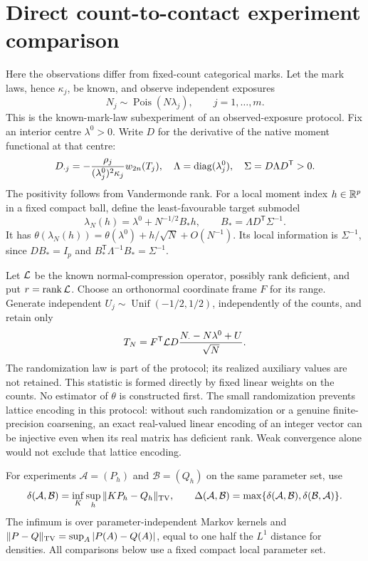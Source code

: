 \section{Direct count-to-contact experiment comparison}\label{sec:score-contact}
Here the observations differ from fixed-count categorical marks. Let the mark laws, hence $\kappa_j$, be known, and observe independent exposures
\[
 N_j\sim\operatorname{Pois}(N\lambda_j),\qquad j=1,\ldots,m.
\]
This is the known-mark-law subexperiment of an observed-exposure protocol. Fix an interior centre $\lambda^0>0$. Write $D$ for the derivative of the native moment functional at that centre:
\[
 D_{\cdot j}=-\frac{\rho_j}{(\lambda_j^0)^2\kappa_j}w_{2n}(T_j),
 \quad \Lambda=\operatorname{diag}(\lambda_j^0),\quad
 \Sigma=D\Lambda D^{\mathsf T}>0.
\]
The positivity follows from Vandermonde rank. For a local moment index $h\in\mathbb R^p$ in a fixed compact ball, define the least-favourable target submodel
\begin{equation}\label{eq:least-favourable}
 \lambda_N(h)=\lambda^0+N^{-1/2}B_*h,
 \qquad B_*=\Lambda D^{\mathsf T}\Sigma^{-1}.
\end{equation}
It has $\theta(\lambda_N(h))=\theta(\lambda^0)+h/\sqrt N+O(N^{-1})$. Its local information is $\Sigma^{-1}$, since $DB_*=I_p$ and $B_*^{\mathsf T}\Lambda^{-1}B_*=\Sigma^{-1}$.

Let $\mathcal L$ be the known normal-compression operator, possibly rank deficient, and put $r=\operatorname{rank}\mathcal L$. Choose an orthonormal coordinate frame $F$ for its range. Generate independent $U_j\sim\operatorname{Unif}(-1/2,1/2)$, independently of the counts, and retain only
\begin{equation}\label{eq:direct-statistic}
 T_N=F^{\mathsf T}\mathcal L D\frac{N_\cdot-N\lambda^0+U}{\sqrt N}.
\end{equation}
The randomization law is part of the protocol; its realized auxiliary values are not retained. This statistic is formed directly by fixed linear weights on the counts. No estimator of $\theta$ is constructed first. The small randomization prevents lattice encoding in this protocol: without such randomization or a genuine finite-precision coarsening, an exact real-valued linear encoding of an integer vector can be injective even when its real matrix has deficient rank. Weak convergence alone would not exclude that lattice encoding.

For experiments $\mathcal A=(P_h)$ and $\mathcal B=(Q_h)$ on the same parameter set, use
\[
 \delta(\mathcal A,\mathcal B)=\inf_K\sup_h\|KP_h-Q_h\|_{\rm TV},
 \qquad \Delta(\mathcal A,\mathcal B)
       =\max\{\delta(\mathcal A,\mathcal B),\delta(\mathcal B,\mathcal A)\}.
\]
The infimum is over parameter-independent Markov kernels and
$\|P-Q\|_{\rm TV}=\sup_A|P(A)-Q(A)|$, equal to one half the $L^1$ distance for densities. All comparisons below use a fixed compact local parameter set.

